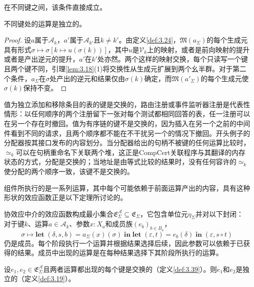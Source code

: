 在不同键之间，该条件直接成立。

\begin{theorem}\label{thm:3.40}
不同键处的运算是独立的。
\end{theorem}

\begin{proof}
设$a$属于$\mathcal{A}_k$，$a'$属于$\mathcal{A}_{k'}$且$k \neq k'$。由定义\ref{def:3.24}，$\mathfrak{M}(a_\Sigma)$的每个生成元具有形式$\sigma \mapsto \sigma[k \mapsto u(\sigma(k))]$，其中$u$是$\mathcal{V}_k$上的映射，或者是前向映射的提升或者是产出逆元的提升，$a'$在$k'$处亦然。两个这样的映射交换，每个只读写一个键且两个键不同，引理\ref{lem:3.18}(1)将交换性从生成元扩展到两个幺半群。对于第二个条件，$a_\Sigma$在$\sigma$处产出的逆元和结果仅由$\sigma(k)$确定，而$\mathfrak{M}(a'_\Sigma)$的每个生成元使$\sigma(k)$保持不变。
\end{proof}

值为独立添加和移除条目的表的键是交换的，路由注册或事件监听器注册是代表性情形：以任何顺序的两个注册留下一张对每个测试都相同回答的表，任一注册可以在另一个存在时撤回。值为有序链的键不是交换的，因为插入在另一个之前的中间件看到不同的请求，且两个顺序都不能在不干扰另一个的情况下撤回。开头例子的分配器按其接口发布的内容划分。当分配器给出的句柄不被键的任何运算比较时，$\simeq_k$可以在句柄重命名下关联两个堆，这正是CompCert关联程序与其翻译的内存状态的方式\cite{ref42}，分配是交换的；当地址是由等式比较的结果时，没有任何容许的$\simeq_k$使分配的两个顺序一致，该键不是交换的。

组件所执行的是一系列运算，其中每个可能依赖于前面运算产出的内容，具有这种形状的效应函数正是以下定理所讨论的。

\begin{definition}\label{def:3.41}
协效应中介的效应函数构成最小集合$\mathfrak{E}^{\mathcal{A}}_\Sigma \subseteq \mathfrak{E}_\Sigma$，它包含单位元$\eta_\Sigma$并对以下封闭：对于键$k$、运算$a \in \mathcal{A}_k$、参数$x: X_a$和成员族$(e_b)_{b \in B_a}$，
\begin{equation}\label{eq:3.36}
\sigma \mapsto \mathbf{let}\;(\delta, s, b) = a_\Sigma(x)(\sigma)\;\mathbf{in}\;\mathbf{let}\;(\varepsilon, t) = e_b(\delta)\;\mathbf{in}\;(\varepsilon, s \circ t)
\end{equation}
仍是成员。每个阶段执行一个运算并根据结果选择后续，因此参数可以依赖于已获得的结果。成员中出现的运算是在每种结果选择下其阶段所执行的运算。
\end{definition}

\begin{theorem}\label{thm:3.42}
设$e_1, e_2 \in \mathfrak{E}^{\mathcal{A}}_\Sigma$且两者运算都出现的每个键是交换的（定义\ref{def:3.39}）。则$e_1$和$e_2$是独立的（定义\ref{def:3.19}）。
\end{theorem}

